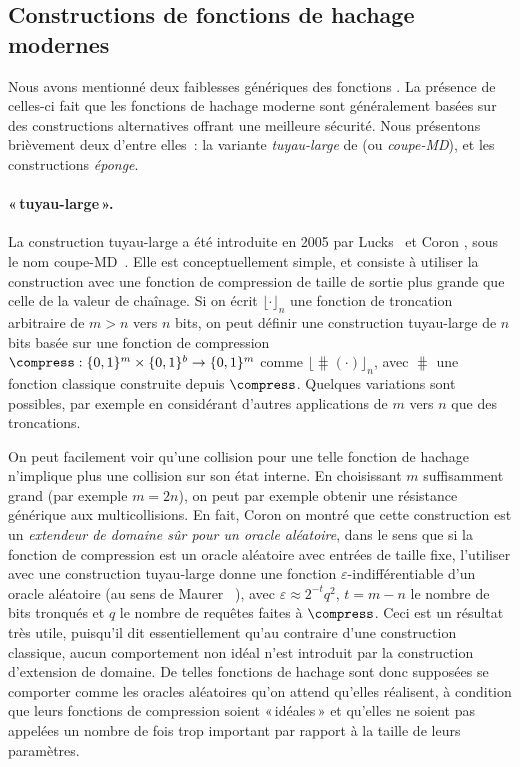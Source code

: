 \subsection{Constructions de fonctions de hachage modernes}
\label{sec:fbetter}

Nous avons mentionné deux faiblesses génériques des fonctions \merkdam. La présence de celles-ci fait que les fonctions de hachage moderne sont généralement
basées sur des constructions alternatives offrant une meilleure sécurité. Nous présentons brièvement deux d'entre elles~: la
variante \emph{tuyau-large} de \merkdam (ou \emph{coupe-MD}), et les constructions \emph{éponge}. 


\paragraph{\merkdam «\,tuyau-large\,».}
La construction tuyau-large a été introduite en 2005 par Lucks~\cite{DBLP:conf/asiacrypt/Lucks05}
et Coron \etal, sous le nom coupe-MD~\cite{DBLP:conf/crypto/CoronDMP05}.
Elle est conceptuellement simple, et consiste à utiliser la construction \merkdam avec une fonction de compression de taille de sortie plus grande que celle de la valeur de chaînage.
Si on écrit
$\lfloor\cdot\rfloor_n$
une fonction de troncation arbitraire de $m > n$ vers $n$ bits, on peut définir
une construction tuyau-large de $n$ bits basée sur une fonction de compression $\compress : \{0,1\}^m \times \{0,1\}^b \rightarrow \{0,1\}^m$
comme $\lfloor\hash(\cdot)\rfloor_n$, avec $\hash$ une fonction \merkdam classique construite depuis $\compress$.
Quelques variations sont possibles, par exemple en considérant d'autres applications de $m$ vers $n$ que des troncations.

On peut facilement voir qu'une collision pour une telle fonction de hachage n'implique plus une collision sur son état interne.
En choisissant $m$ suffisamment grand (par exemple $m = 2n$),
on peut par exemple obtenir une résistance générique aux multicollisions. En fait,
Coron \etal on montré que cette construction est un \emph{extendeur de domaine sûr pour un oracle aléatoire}, dans le sens
que si la fonction de compression est un oracle aléatoire avec entrées de taille fixe, l'utiliser avec une construction tuyau-large donne une fonction
$\varepsilon$-indifférentiable d'un oracle aléatoire
(au sens de Maurer \etal~\cite{DBLP:conf/tcc/MaurerRH04}), avec
$\varepsilon \approx 2^{-t}q^2$, $t = m - n$ le nombre de bits tronqués et $q$ le nombre de requêtes faites à $\compress$.
Ceci est un résultat très utile, puisqu'il dit essentiellement qu'au contraire d'une construction \merkdam classique, aucun comportement non idéal
n'est introduit par la construction d'extension de domaine. De telles fonctions de hachage sont donc supposées se comporter comme les oracles aléatoires
qu'on attend qu'elles réalisent, à condition que leurs fonctions de compression soient «\,idéales\,» et qu'elles ne soient
pas appelées un nombre de fois trop important par rapport à la taille de leurs paramètres.


